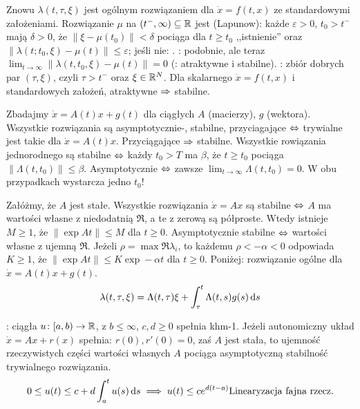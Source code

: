 Znowu  $\lambda(t, \tau, \xi)$ jest ogólnym rozwiązaniem dla $\dot x = f(t, x)$ ze standardowymi założeniami.
Rozwiązanie $\mu$ na $(t^-, \infty) \subseteq \mathbb{R}$ jest  (Lapunow): każde $\varepsilon > 0$, $t_0 > t^-$ mają $\delta > 0$, że $\|\xi - \mu(t_0)\|  < \delta$ pociąga dla $t \ge t_0$ ,,istnienie'' oraz $\|\lambda(t; t_0, \xi) - \mu(t)\| \le \varepsilon$; jeśli nie: . 
: podobnie, ale teraz $\lim_{t\to \infty} \|\lambda(t, t_0, \xi) - \mu(t)\|= 0$ (: atraktywne i stabilne).
: zbiór dobrych par $(\tau, \xi)$, czyli $\tau > t^-$ oraz $\xi \in \mathbb{R}^N$.
Dla skalarnego $\dot x = f(t,x)$ i standardowych założeń, atraktywne $\Rightarrow$ stabilne. %

Zbadajmy $\dot x = A(t) x + g(t)$ dla ciągłych $A$ (macierzy), $g$ (wektora).
Wszystkie rozwiązania są asymptotycznie-, stabilne, przyciagające $\Leftrightarrow$ trywialne jest takie dla $\dot x = A(t) x$.
Przyciągające $\Rightarrow$ stabilne.
Wszystkie rowiązania jednorodnego są stabilne $\Leftrightarrow$ każdy $t_0 > T$ ma $\beta$, że $t \ge t_0$ pociąga $\|\Lambda(t, t_0)\| \le \beta$.
Asymptotycznie $\Leftrightarrow$ zawsze $\lim_{t \to \infty} \Lambda (t, t_0) = 0$.
W obu przypadkach wystarcza jedno $t_0$!

Załóżmy, że $A$ jest stałe.
Wszystkie rozwiązania $\dot x = Ax$ są stabilne $\Leftrightarrow$ $A$ ma wartości własne z niedodatnią $\Re$, a te z zerową są półproste.
Wtedy istnieje $M \ge 1$, że $\|\exp At\| \le M$ dla $t \ge 0$.
Asymptotycznie stabilne $\Leftrightarrow$ wartości własne z ujemną $\Re$.
Jeżeli $\rho = \max \Re \lambda_i$, to każdemu $\rho < - \alpha < 0$ odpowiada $K \ge 1$, że $\| \exp At \| \le K \exp -\alpha t$ dla $t \ge 0$.
Poniżej: rozwiązanie ogólne dla $\dot x = A(t) x + g(t)$.
\[
	\lambda(t, \tau, \xi) =\Lambda(t, \tau) \xi + \int_\tau^t \Lambda(t,s) g(s) \,\textrm{d} s
\]

:  ciągła $u \colon [a,b) \to \mathbb{R}$, z  $b \le \infty$, $c, d \ge 0$ spełnia khm-1.
Jeżeli autonomiczny układ $\dot x = Ax + r(x)$ spełnia: $r(0), r'(0) = 0$, zaś $A$ jest stała, to ujemność rzeczywistych części wartości własnych $A$ pociąga asymptotyczną stabilność trywialnego rozwiązania.
\[
	0 \le u(t) \le c + d\int_a^t u(s) \,\textrm{d}s \implies u(t) \le c e^{d(t-a)} \hfill \mbox{Linearyzacja fajna rzecz.}
\]


